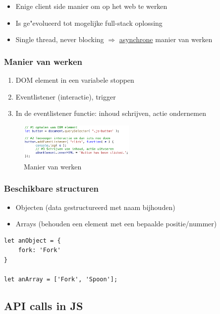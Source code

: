 \documentclass{article}
\begin{document}
\begin{itemize}
    \item Enige client side manier om op het web te werken
    \item Is ge"evolueerd tot mogelijke full-stack oplossing
    \item Single thread, never blocking $\Rightarrow$ \underline{asynchrone} manier van werken
\end{itemize}

\subsubsection{Manier van werken}

\begin{enumerate}
    \item DOM element in een variabele stoppen
    \item Eventlistener (interactie), trigger
    \item In de eventlistener functie: inhoud schrijven, actie ondernemen
\end{enumerate}

\begin{figure}[H]
    \centering
    \includegraphics[width=0.5\textwidth]{js-manier-van-werken.png}
    \caption{Manier van werken}
\end{figure}

\subsubsection{Beschikbare structuren}

\begin{itemize}
    \item Objecten (data gestructureerd met naam bijhouden)
    \item Arrays (behouden een element met een bepaalde positie/nummer)
\end{itemize}

\begin{verbatim}
let anObject = {
    fork: 'Fork'
}

let anArray = ['Fork', 'Spoon'];
\end{verbatim}


\subsection{API calls in JS}
\end{document}
